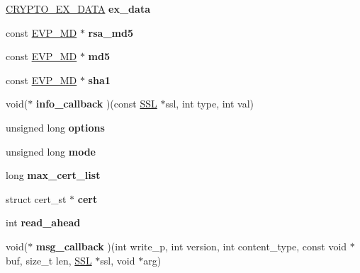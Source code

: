 \begin{DoxyCompactItemize}
\hyperlink{structcrypto__ex__data__st}{C\+R\+Y\+P\+T\+O\+\_\+\+E\+X\+\_\+\+D\+A\+TA} {\bfseries ex\+\_\+data}
\item 
\mbox{\label{structssl__ctx__st_a297d3bf2019076959d84c41a41e7ac3b}} 
const \hyperlink{structenv__md__st}{E\+V\+P\+\_\+\+MD} $\ast$ {\bfseries rsa\+\_\+md5}
\item 
\mbox{\label{structssl__ctx__st_a0d2c62fc7903597eef4c4890ba327a16}} 
const \hyperlink{structenv__md__st}{E\+V\+P\+\_\+\+MD} $\ast$ {\bfseries md5}
\item 
\mbox{\label{structssl__ctx__st_ae6ea4c79f3be1d3c103b290e08009204}} 
const \hyperlink{structenv__md__st}{E\+V\+P\+\_\+\+MD} $\ast$ {\bfseries sha1}
\item 
\mbox{\label{structssl__ctx__st_aad6ab81d36b3ea41bc75aa86586396dc}} 
void($\ast$ {\bfseries info\+\_\+callback} )(const \hyperlink{structssl__st}{S\+SL} $\ast$ssl, int type, int val)
\item 
\mbox{\label{structssl__ctx__st_aeca7f42401b9a9465d47a206f155f6ba}} 
unsigned long {\bfseries options}
\item 
\mbox{\label{structssl__ctx__st_a15675b65ff5a91cc12c75247cec9c90e}} 
unsigned long {\bfseries mode}
\item 
\mbox{\label{structssl__ctx__st_a7ee4c1615f56a2034547f06d040613df}} 
long {\bfseries max\+\_\+cert\+\_\+list}
\item 
\mbox{\label{structssl__ctx__st_a12fd74ab996b83c38cd73136a1163471}} 
struct cert\+\_\+st $\ast$ {\bfseries cert}
\item 
\mbox{\label{structssl__ctx__st_a454cbb1294b6b36ab36cff39c541ba70}} 
int {\bfseries read\+\_\+ahead}
\item 
\mbox{\label{structssl__ctx__st_ada261e72ed5d3ce460ca6dcf34ec53dd}} 
void($\ast$ {\bfseries msg\+\_\+callback} )(int write\+\_\+p, int version, int content\+\_\+type, const void $\ast$buf, size\+\_\+t len, \hyperlink{structssl__st}{S\+SL} $\ast$ssl, void $\ast$arg)

\end{DoxyCompactItemize}
